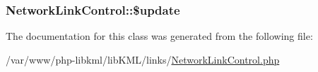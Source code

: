 \label{de/d14/classNetworkLinkControl_a4d2f5e9945fc607a1fa9ae50b5436cc1}
\hypertarget{classNetworkLinkControl_aea10b81f86df7701b3d4b42a5821ba1d}{
\subsubsection[{\$update}]{\setlength{\rightskip}{0pt plus 5cm}NetworkLinkControl::\$update}}
\label{de/d14/classNetworkLinkControl_aea10b81f86df7701b3d4b42a5821ba1d}


The documentation for this class was generated from the following file:\begin{DoxyCompactItemize}
\item 
/var/www/php-\/libkml/libKML/links/\hyperlink{NetworkLinkControl_8php}{NetworkLinkControl.php}\end{DoxyCompactItemize}
